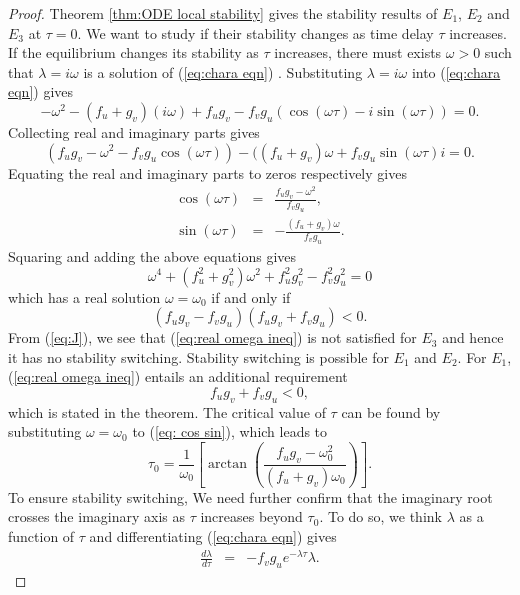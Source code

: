 \documentclass{aims}
\theoremstyle{definition}
\begin{document}
\begin{proof}
Theorem \ref{thm:ODE local stability} gives the stability results of $E_1$, $E_2$ and $E_3$ at $\tau=0$. We want to study if their stability changes as time delay $\tau$ increases. If the equilibrium changes its stability as $\tau$ increases, there must exists $\omega>0$ such that $\lambda=i\omega$ is a solution of (\ref{eq:chara eqn}) \cite{KuangDDEBook}. Substituting $\lambda=i\omega$ into (\ref{eq:chara eqn}) gives 
\[
-\omega^{2}-(f_{u}+g_{v})(i\omega)+f_{u}g_{v}-f_{v}g_{u}(\cos(\omega\tau)-i\sin(\omega\tau))=0.
\]
Collecting real and imaginary parts gives
\[
(f_{u}g_{v}-\omega^{2}-f_{v}g_{u}\cos(\omega\tau))-((f_{u}+g_{v})\omega+f_{v}g_{u}\sin(\omega\tau)i=0.
\]
Equating the real and imaginary parts to zeros respectively gives
\begin{subequations}\label{eq: cos sin}
\begin{eqnarray}
\cos(\omega\tau) & = & \frac{f_{u}g_{v}-\omega^{2}}{f_{v}g_{u}},\\
\sin(\omega\tau) & = & -\frac{(f_{u}+g_{v})\omega}{f_{v}g_{u}}.
\end{eqnarray}
\end{subequations} Squaring and adding the above equations gives
\[
\omega^{4}+(f_{u}^2+g_{v}^2)\omega^{2}+f_{u}^{2}g_{v}^{2}-f_{v}^{2}g_{u}^{2}=0
\]
which has a real solution $\omega=\omega_{0}$ if and only if 
\begin{equation}
(f_{u}g_{v}-f_{v}g_{u})(f_{u}g_{v}+f_{v}g_{u})<0.\label{eq:real omega ineq}
\end{equation}
From (\ref{eq:J}), we see that (\ref{eq:real omega ineq}) is not satisfied for $E_{3}$ and hence it has no stability switching. Stability switching is possible for $E_1$ and $E_2$.
For $E_{1}$, (\ref{eq:real omega ineq}) entails an additional requirement 
\begin{equation}
f_{u}g_{v}+f_{v}g_{u}<0, \label{eq:swtiching cond}
\end{equation} 
which is stated in the theorem. 
The critical value of $\tau$ can be found
by substituting $\omega=\omega_{0}$ to (\ref{eq: cos sin}), which
leads to 
\[
\tau_{0}=\frac{1}{\omega_{0}}[\arctan(\frac{f_{u}g_{v}-\omega_{0}^{2}}{(f_{u}+g_{v})\omega_{0}})].
\]
To ensure stability switching, We need further confirm that the imaginary
root crosses the imaginary axis as $\tau$ increases beyond $\tau_{0}$.
To do so, we think $\lambda$ as a function of $\tau$ and differentiating
(\ref{eq:chara eqn}) gives 
\begin{eqnarray*}
[2\lambda-(f_{u}+g_{v})+f_{v}g_{u}e^{-\lambda\tau}\tau]\frac{d\lambda}{d\tau} & = & -f_{v}g_{u}e^{-\lambda\tau}\lambda.

\end{eqnarray*}
\end{proof}
\end{document}
